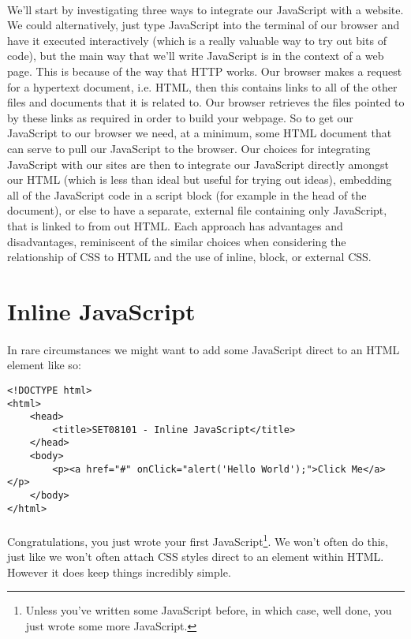 \documentclass[10pt, a4paper]{article}
\begin{document}
\paragraph{} We'll start by investigating three ways to integrate our JavaScript with a website. We could alternatively, just type JavaScript into the terminal of our browser and have it executed interactively (which is a really valuable way to try out bits of code), but the main way that we'll write JavaScript is in the context of a web page. This is because of the way that HTTP works. Our browser makes a request for a hypertext document, i.e. HTML, then this contains links to all of the other files and documents that it is related to. Our browser retrieves the files pointed to by these links as required in order to build your webpage. So to get our JavaScript to our browser we need, at a minimum, some HTML document that can serve to pull our JavaScript to the browser. Our choices for integrating JavaScript with our sites are then to integrate our JavaScript directly amongst our HTML (which is less than ideal but useful for trying out ideas), embedding all of the JavaScript code in a script block (for example in the head of the document), or else to have a separate, external file containing only JavaScript, that is linked to from out HTML. Each approach has advantages and disadvantages, reminiscent of the similar choices when considering the relationship of CSS to HTML and the use of inline, block, or external CSS.

\section{Inline JavaScript}

\paragraph{} In rare circumstances we might want to add some JavaScript direct to an HTML element like so:

\begin{lstlisting}
<!DOCTYPE html>
<html>
    <head>
        <title>SET08101 - Inline JavaScript</title>
    </head>
    <body>
        <p><a href="#" onClick="alert('Hello World');">Click Me</a></p> 
    </body>
</html>
\end{lstlisting}

\paragraph{} Congratulations, you just wrote your first JavaScript\footnote{Unless you've written some JavaScript before, in which case, well done, you just wrote some more JavaScript.}. We won't often do this, just like we won't often attach CSS styles direct to an element within HTML. However it does keep things incredibly simple.
\end{document}
